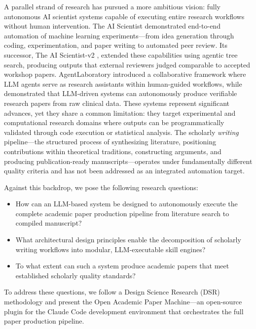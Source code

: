 \documentclass{article}
\begin{document}
A parallel strand of research has pursued a more ambitious vision: fully autonomous AI scientist systems capable of executing entire research workflows without human intervention. The AI Scientist \citep{lu2024ai_scientist} demonstrated end-to-end automation of machine learning experiments---from idea generation through coding, experimentation, and paper writing to automated peer review. Its successor, The AI Scientist-v2 \citep{yamada2025ai_scientist_v2}, extended these capabilities using agentic tree search, producing outputs that external reviewers judged comparable to accepted workshop papers. AgentLaboratory \citep{schmidgall2025agentlab} introduced a collaborative framework where LLM agents serve as research assistants within human-guided workflows, while \citet{ifargan2025autonomous} demonstrated that LLM-driven systems can autonomously produce verifiable research papers from raw clinical data. These systems represent significant advances, yet they share a common limitation: they target experimental and computational research domains where outputs can be programmatically validated through code execution or statistical analysis. The scholarly \emph{writing} pipeline---the structured process of synthesizing literature, positioning contributions within theoretical traditions, constructing arguments, and producing publication-ready manuscripts---operates under fundamentally different quality criteria and has not been addressed as an integrated automation target.

Against this backdrop, we pose the following research questions:
\begin{itemize}
    \item[\textbf{RQ1:}] How can an LLM-based system be designed to autonomously execute the complete academic paper production pipeline from literature search to compiled manuscript?
    \item[\textbf{RQ2:}] What architectural design principles enable the decomposition of scholarly writing workflows into modular, LLM-executable skill engines?
    \item[\textbf{RQ3:}] To what extent can such a system produce academic papers that meet established scholarly quality standards?
\end{itemize}

\noindent To address these questions, we follow a Design Science Research (DSR) methodology \citep{peffers2007dsrm} and present the Open Academic Paper Machine---an open-source plugin for the Claude Code development environment that orchestrates the full paper production pipeline.
\end{document}

